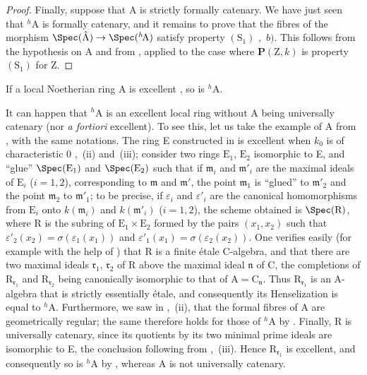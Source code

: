 \begin{proof}
Finally, suppose that A is strictly formally catenary.  We have just seen that ${}^h\!\mathrm{A}$ is formally catenary, and it remains to prove that the fibres of the morphism $\Spec(\hat{\mathrm{A}})\to\Spec({}^h\!\mathrm{A})$ satisfy property $(\mathrm{S}_1)$ ,~$b)$.  This follows from the hypothesis on A and from , applied to the case where $\boldsymbol{P}(\mathrm{Z},k)$ is property $(\mathrm{S}_1)$ for Z.
\end{proof}

\begin{corollary}[18.7.6]
\label{IV.18.7.6}
If a local Noetherian ring A is excellent , so is ${}^h\!\mathrm{A}$.
\end{corollary}

\begin{remark}[18.7.7]
\label{IV.18.7.7}
It can happen that ${}^h\!\mathrm{A}$ is an excellent local ring without A being universally catenary (nor \emph{a fortiori} excellent).
To see this, let us take the example of A from , with the same notations.
The ring E constructed in  is excellent when $k_0$ is of characteristic 0 ,~(ii) and~(iii);
consider two rings $\mathrm{E}_1$, $\mathrm{E}_2$ isomorphic to E, and ``glue'' $\Spec(\mathrm{E}_1)$ and $\Spec(\mathrm{E}_2)$ such that if $\mathfrak{m}_i$ and $\mathfrak{m}'_i$ are the maximal ideals of $\mathrm{E}_i$ ($i=1,2$), corresponding to $\mathfrak{m}$ and $\mathfrak{m}'$, the point $\mathfrak{m}_1$ is ``glued'' to $\mathfrak{m}'_2$ and the point $\mathfrak{m}_2$ to $\mathfrak{m}'_1$;
to be precise, if $\varepsilon_i$ and $\varepsilon'_i$ are the canonical homomorphisms from $\mathrm{E}_i$ onto $k(\mathfrak{m}_i)$ and $k(\mathfrak{m}'_i)$ ($i=1,2$), the scheme obtained is $\Spec(\mathrm{R})$, where R is the subring of $\mathrm{E}_1\times\mathrm{E}_2$ formed by the pairs $(x_1,x_2)$ such that $\varepsilon'_2(x_2)=\sigma(\varepsilon_1(x_1))$ and $\varepsilon'_1(x_1)=\sigma(\varepsilon_2(x_2))$.
One verifies easily (for example with the help of ) that R is a finite \'{e}tale C-algebra, and that there are two maximal ideals $\mathfrak{r}_1$, $\mathfrak{r}_2$ of R above the maximal ideal $\mathfrak{n}$ of C, the completions of $\mathrm{R}_{\mathfrak{r}_1}$ and $\mathrm{R}_{\mathfrak{r}_2}$ being canonically isomorphic to that of $\mathrm{A}=\mathrm{C}_{\mathfrak{n}}$.  Thus $\mathrm{R}_{\mathfrak{r}_1}$ is an A-algebra that is strictly essentially \'{e}tale, and consequently its Henselization is equal to ${}^h\!\mathrm{A}$.
Furthermore, we saw in ,~(ii), that the formal fibres of A are geometrically regular; the same therefore holds for those of ${}^h\!\mathrm{A}$ by .  Finally, R is universally catenary, since its quotients by its two minimal prime ideals are isomorphic to E, the conclusion following from ,~(iii).  Hence $\mathrm{R}_{\mathfrak{r}_1}$ is excellent, and consequently so is ${}^h\!\mathrm{A}$ by , whereas A is not universally catenary.
\end{remark}


